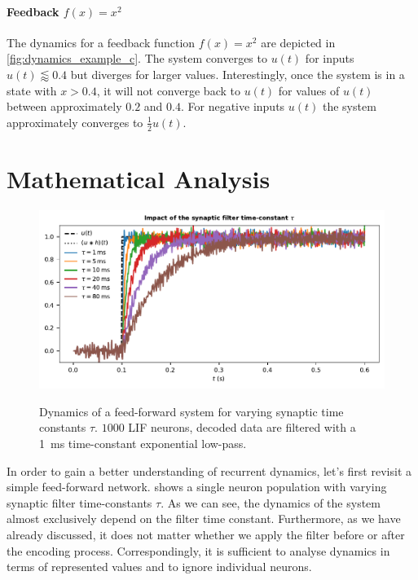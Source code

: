\documentclass[10pt,letterpaper,oneside]{article}
\begin{document}
\paragraph{Feedback $f(x) = x^2$}
The dynamics for a feedback function $f(x) = x^2$ are depicted in \cref{fig:dynamics_example_c}. The system converges to $u(t)$ for inputs $u(t) \lessapprox 0.4$ but diverges for larger values. Interestingly, once the system is in a state with $x > 0.4$, it will not converge back to $u(t)$ for values of $u(t)$ between approximately $0.2$ and $0.4$. For negative inputs $u(t)$ the system approximately converges to $\frac{1}2 u(t)$.

\section*{Mathematical Analysis}

\begin{figure}
	\centering
	\includegraphics{media/synaptic_filter.pdf}\\[-0.5cm]
	\caption{Dynamics of a feed-forward system for varying synaptic time constants $\tau$. $1000$ LIF neurons, decoded data are filtered with a \SI{1}{\milli\second} time-constant exponential low-pass.}
	\label{fig:synaptic_filter}
\end{figure}


In order to gain a better understanding of recurrent dynamics, let's first revisit a simple feed-forward network.  shows a single neuron population with varying synaptic filter time-constants $\tau$. As we can see, the dynamics of the system almost exclusively depend on the filter time constant. Furthermore, as we have already discussed, it does not matter whether we apply the filter before or after the encoding process. Correspondingly, it is sufficient to analyse dynamics in terms of represented values and to ignore individual neurons.
\end{document}

